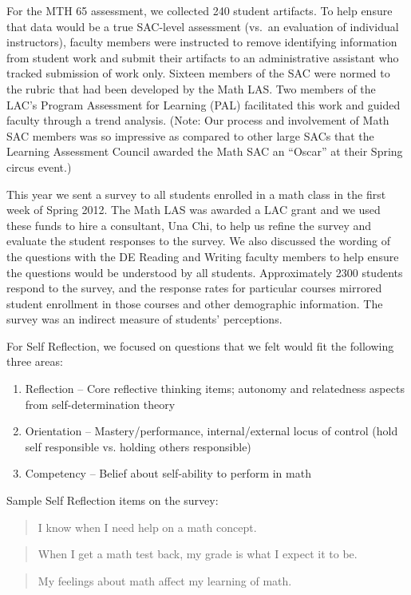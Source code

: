 \begin{description}
For the MTH 65 assessment, we collected 240 student artifacts.  To help ensure that data would be a true SAC-level assessment (vs.\ an evaluation of individual instructors), faculty members were instructed to remove identifying information from student work and submit their artifacts to an administrative assistant who tracked submission of work only.  Sixteen members of the SAC were normed to the rubric that had been developed by the Math LAS.  Two members of the LAC's Program Assessment for Learning (PAL) facilitated this work and guided faculty through a trend analysis.  (Note: Our process and involvement of Math SAC members was so impressive as compared to other large SACs that the Learning Assessment Council awarded the Math SAC an ``Oscar'' at their Spring circus event.)

\item[2011/12: Self Reflection and Professional Competence]

This year we sent a survey to all students enrolled in a math class in the first week of Spring 2012.  The Math LAS was awarded a LAC grant and we used these funds to hire a consultant, Una Chi, to help us refine the survey and evaluate the student responses to the survey.  We also discussed the wording of the questions with the DE Reading and Writing faculty members to help ensure the questions would be understood by all students. Approximately 2300 students respond to the survey, and the response rates for particular courses mirrored student enrollment in those courses and other demographic information.  The survey was an indirect measure of students' perceptions.  

For Self Reflection, we focused on questions that we felt would fit the following three areas:
\begin{enumerate}
\item Reflection -- Core reflective thinking items; autonomy and relatedness aspects from self-determination theory
\item Orientation -- Mastery/performance, internal/external locus of control (hold self responsible vs. holding others responsible)
\item Competency -- Belief about self-ability to perform in math
\end{enumerate}
Sample Self Reflection items on the survey:
\begin{quote}
\item I know when I need help on a math concept.
\end{quote}
\begin{quote}
\item When I get a math test back, my grade is what I expect it to be.
\end{quote}
\begin{quote}
\item My feelings about math affect my learning of math.
\end{quote}


\end{description}
